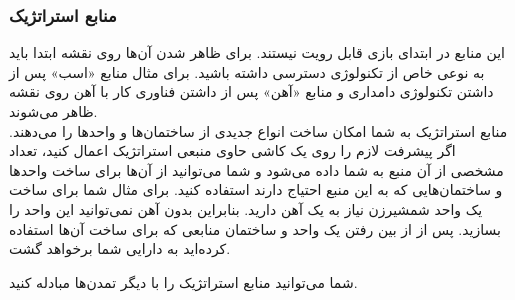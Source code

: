 \documentclass[]{article}
\begin{document}
\subsubsection*{{\titr منابع استراتژیک}}
این منابع در ابتدای بازی قابل رویت نیستند. برای ظاهر شدن آن‌ها روی نقشه ابتدا باید به نوعی خاص از تکنولوژی دسترسی داشته باشید. برای مثال منابع «اسب» پس از داشتن تکنولوژی دامداری و منابع «آهن» پس از داشتن فناوری کار با آهن روی نقشه ظاهر می‌شوند. 
\\
منابع استراتژیک به شما امکان ساخت انواع جدیدی از ساختمان‌‌ها و واحدها را می‌دهند. اگر پیشرفت لازم را روی یک کاشی حاوی منبعی استراتژیک اعمال کنید، تعداد مشخصی از آن منبع به شما داده می‌شود و شما می‌توانید از آن‌ها برای ساخت واحدها و ساختمان‌هایی که به این منبع احتیاج دارند استفاده کنید. برای مثال شما برای ساخت یک واحد شمشیرزن نیاز به یک آهن دارید. بنابراین بدون آهن نمی‌توانید این واحد را بسازید. پس از از بین رفتن یک واحد و ساختمان منابعی که برای ساخت آن‌ها استفاده کرده‌اید به دارایی شما برخواهد گشت.

شما می‌توانید منابع استراتژیک را با دیگر تمدن‌ها مبادله کنید.
\end{document}
